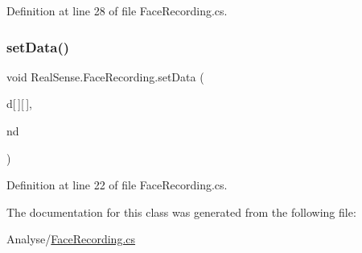 Definition at line 28 of file Face\+Recording.\+cs.

\mbox{\label{class_real_sense_1_1_face_recording_a94e9208ed4f1fe15264ab3b2293f3ce4}} 
\subsubsection{\texorpdfstring{set\+Data()}{setData()}}
{\footnotesize\ttfamily void Real\+Sense.\+Face\+Recording.\+set\+Data (\begin{DoxyParamCaption}\item[{P\+X\+C\+M\+Face\+Data.\+Landmark\+Point}]{d\mbox{[}$\,$\mbox{]}\mbox{[}$\,$\mbox{]},  }\item[{P\+X\+C\+M\+Face\+Data.\+Landmark\+Point \mbox{[}$\,$\mbox{]}}]{nd }\end{DoxyParamCaption})}



Definition at line 22 of file Face\+Recording.\+cs.



The documentation for this class was generated from the following file\+:\begin{DoxyCompactItemize}
\item 
Analyse/\hyperlink{_face_recording_8cs}{Face\+Recording.\+cs}\end{DoxyCompactItemize}
